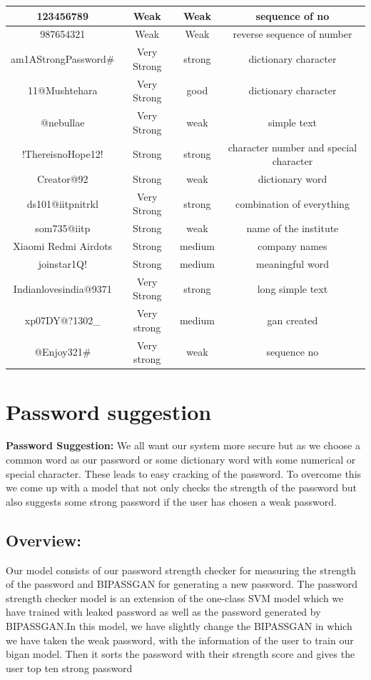 \documentclass[runningheads]{llncs}
\begin{document}
{\begin{table}[htb]
\begin{tabular}{||c||c||c||c||}
\hline
123456789 & Weak & Weak& sequence of no\\
\hline
987654321 & Weak & Weak&reverse sequence of number\\
\hline
am1AStrongPassword# & Very Strong & strong& dictionary character\\ 
\hline
11@Mushtehara &Very Strong&good& dictionary character\\
\hline
@nebullae&Very Strong&weak& simple text\\
\hline
!ThereisnoHope12!&Strong&strong& character number and special character \\
\hline
Creator@92&Strong&weak& dictionary word\\
\hline
ds101@iitpnitrkl&Very Strong&strong& combination of everything\\
\hline
som735@iitp&Strong&weak& name of the institute\\
\hline
Xiaomi Redmi Airdots&Strong&medium& company names\\
\hline
joinstar1Q!&Strong&medium& meaningful word\\
\hline
Indianlovesindia@9371&Very Strong&strong& long simple text\\
\hline
xp07DY@?1302_&Very strong&medium& gan created\\
\hline
@Enjoy321#&Very strong&weak&sequence no\\
	\hline
	\hline
\end{tabular}

\end{table}
}

\section{Password suggestion}
\textbf{Password Suggestion: }We all want our system more secure but as we choose a common word as our password or some dictionary word with some numerical or special character. These leads to easy cracking of the password. To overcome this we come up with a model that not only checks the strength of the password but also suggests some strong password if the user has chosen a weak password.
\subsection{Overview: }Our model consists of our password strength checker for measuring the strength of the password and BIPASSGAN for generating a new password. The password strength checker model is an extension of the one-class SVM model which we have trained with leaked password as well as the password generated by BIPASSGAN.In this model, we have slightly change the BIPASSGAN in which we have taken the weak password, with the information of the user to train our bigan model. Then it sorts the password with their strength score and gives the user top ten strong password
\end{document}
